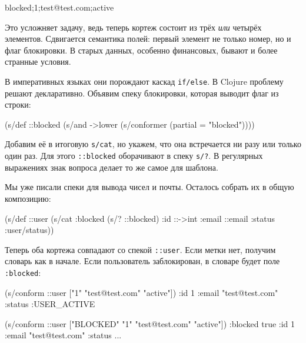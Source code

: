 \begin{english}
  \begin{text}
blocked;1;test@test.com;active
  \end{text}
\end{english}

Это усложняет задачу, ведь теперь кортеж состоит из трёх \emph{или} четырёх
элементов. Сдвигается семантика полей: первый элемент не только номер, но и флаг
блокировки. В старых данных, особенно финансовых, бывают и более странные
условия.

В императивных языках они порождают каскад \verb|if/else|. В Clojure проблему
решают декларативно. Объявим спеку блокировки, которая выводит флаг из строки:

\begin{english}
  \begin{clojure}
(s/def ::blocked
  (s/and
   ->lower
   (s/conformer (partial = "blocked"))))
  \end{clojure}
\end{english}


Добавим её в итоговую \verb|s/cat|, но укажем, что она встречается ни разу
или только один раз. Для этого \verb|::blocked| оборачивают в спеку
\verb|s/?|.  В регулярных выражениях знак вопроса делает то же самое для
шаблона.

Мы уже писали спеки для вывода чисел и почты. Осталось собрать их в общую
композицию:

\begin{english}
  \begin{clojure}
(s/def ::user
  (s/cat :blocked (s/? ::blocked)
         :id ::->int
         :email ::email
         :status :user/status))
  \end{clojure}
\end{english}

Теперь оба кортежа совпадают со спекой \verb|::user|. Если метки нет, получим
словарь как в начале. Если пользователь заблокирован, в словаре будет поле
\verb|:blocked|:

\begin{english}
  \begin{clojure}
(s/conform ::user ["1" "test@test.com" "active"])
{:id 1 :email "test@test.com" :status :USER_ACTIVE}

(s/conform ::user ["BLOCKED" "1" "test@test.com" "active"])
{:blocked true :id 1 :email "test@test.com" :status ...}
  \end{clojure}
\end{english}

